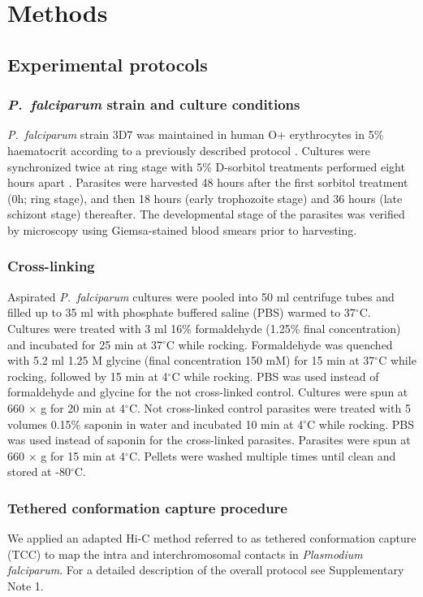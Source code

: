 \section*{Methods}
\subsection*{Experimental protocols}

\subsubsection*{{\em P.\ falciparum} strain and culture conditions}
{\em P.\ falciparum} strain 3D7 was maintained in human O+ erythrocytes in
5\% haematocrit according to a previously described protocol \citep{trager:human}.
Cultures were synchronized twice at ring stage with 5\% D-sorbitol treatments
performed eight hours apart \citep{lambros:synchronization}. Parasites were
harvested 48 hours after the first sorbitol treatment (0h; ring stage), and
then 18 hours (early trophozoite stage) and 36 hours (late schizont stage)
thereafter. The developmental stage of the parasites was verified by microscopy
using Giemsa-stained blood smears prior to harvesting.

\subsubsection*{Cross-linking}
Aspirated {\em P.\ falciparum} cultures were pooled into 50 ml centrifuge
tubes and filled up to 35 ml with phosphate buffered saline (PBS) warmed
to 37$^\circ$C. Cultures were treated with 3 ml 16\% formaldehyde
(1.25\% final concentration) and incubated for 25 min at 37$^\circ$C while rocking.
Formaldehyde was quenched with 5.2 ml 1.25 M glycine (final concentration 150 mM)
for 15 min at 37$^\circ$C while rocking, followed by 15 min at 4$^\circ$C while
rocking. PBS was used instead of formaldehyde and glycine for the not cross-linked
control. Cultures were spun at 660 $\times$ g for 20 min at 4$^\circ$C. Not
cross-linked control parasites were treated with 5 volumes 0.15\% saponin in water
and incubated 10 min at 4$^\circ$C while rocking. PBS was used instead of saponin
for the cross-linked parasites. Parasites were spun at 660 $\times$ g for 15 min
at 4$^\circ$C. Pellets were washed multiple times until clean and stored at -80$^\circ$C.

\subsubsection*{Tethered conformation capture procedure}
We applied an adapted Hi-C method referred to as tethered conformation capture
(TCC) \citep{kalhor:genome} to map the intra and interchromosomal contacts in
{\em Plasmodium falciparum}. For a detailed description of the overall protocol
see Supplementary Note 1.

